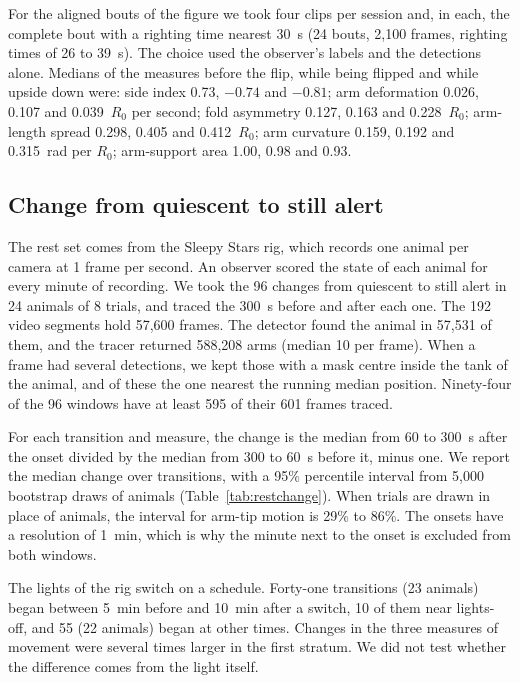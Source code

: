 For the aligned bouts of the figure we took four clips per session and, in each, the complete bout with a righting time nearest 30~s (24 bouts, 2,100 frames, righting times of 26 to 39~s).
The choice used the observer's labels and the detections alone.
Medians of the measures before the flip, while being flipped and while upside down were: side index 0.73, $-0.74$ and $-0.81$; arm deformation 0.026, 0.107 and 0.039~$R_0$ per second; fold asymmetry 0.127, 0.163 and 0.228~$R_0$; arm-length spread 0.298, 0.405 and 0.412~$R_0$; arm curvature 0.159, 0.192 and 0.315~rad per $R_0$; arm-support area 1.00, 0.98 and 0.93.

\subsection*{Change from quiescent to still alert}

The rest set comes from the Sleepy Stars rig, which records one animal per camera at 1 frame per second.
An observer scored the state of each animal for every minute of recording.
We took the 96 changes from quiescent to still alert in 24 animals of 8 trials, and traced the 300~s before and after each one.
The 192 video segments hold 57,600 frames.
The detector found the animal in 57,531 of them, and the tracer returned 588,208 arms (median 10 per frame).
When a frame had several detections, we kept those with a mask centre inside the tank of the animal, and of these the one nearest the running median position.
Ninety-four of the 96 windows have at least 595 of their 601 frames traced.

For each transition and measure, the change is the median from 60 to 300~s after the onset divided by the median from 300 to 60~s before it, minus one.
We report the median change over transitions, with a 95\% percentile interval from 5,000 bootstrap draws of animals (Table~\ref{tab:restchange}).
When trials are drawn in place of animals, the interval for arm-tip motion is 29\% to 86\%.
The onsets have a resolution of 1~min, which is why the minute next to the onset is excluded from both windows.

The lights of the rig switch on a schedule.
Forty-one transitions (23 animals) began between 5~min before and 10~min after a switch, 10 of them near lights-off, and 55 (22 animals) began at other times.
Changes in the three measures of movement were several times larger in the first stratum.
We did not test whether the difference comes from the light itself.

